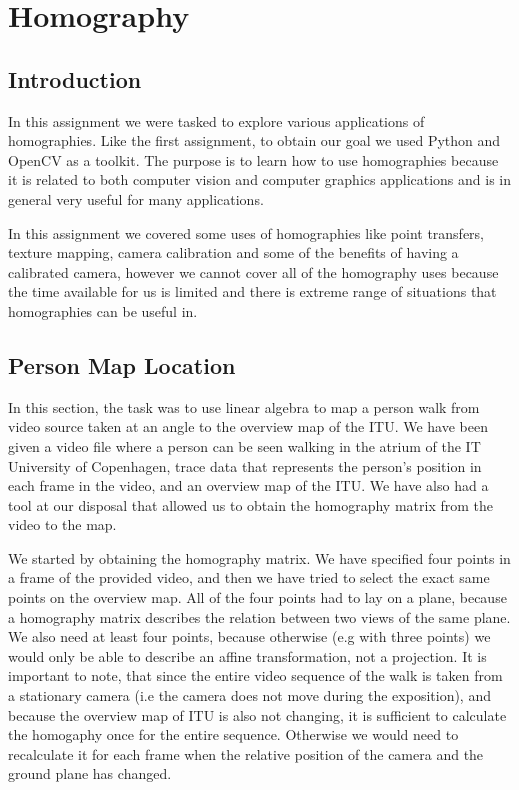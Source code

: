 \pagebreak
\section{Homography}

\subsection{Introduction}
In this assignment we were tasked to explore various applications of homographies. Like the first assignment, to obtain our goal we used Python and OpenCV as a toolkit. The purpose is to learn how to use homographies because it is related to both computer vision and computer graphics applications and is in general very useful for many applications. 

In this assignment we covered some uses of homographies like point transfers, texture mapping, camera calibration and some of the benefits of having a calibrated camera, however we cannot cover all of the homography uses because the time available for us is limited and there is extreme range of situations that homographies can be useful in.


\subsection{Person Map Location}

In this section, the task was to use linear algebra to map a person walk from video source taken at an angle to the overview map of the ITU. We have been given a video file where a person can be seen walking in the atrium of the IT University of Copenhagen, trace data that represents the person's position in each frame in the video, and an overview map of the ITU. We have also had a tool at our disposal that allowed us to obtain the homography matrix from the video to the map. 

We started by obtaining the homography matrix. We have specified four points in a frame of the provided video, and then we have tried to select the exact same points on the overview map. All of the four points had to lay on a plane, because a homography matrix describes the relation between two views of the same plane. We also need at least four points, because otherwise (e.g with three points) we would only be able to describe an affine transformation, not a projection. It is important to note, that since the entire video sequence of the walk is taken from a stationary camera (i.e the camera does not move during the exposition), and because the overview map of ITU is also not changing, it is sufficient to calculate the homogaphy once for the entire sequence. Otherwise we would need to recalculate it for each frame when the relative position of the camera and the ground plane has changed.

